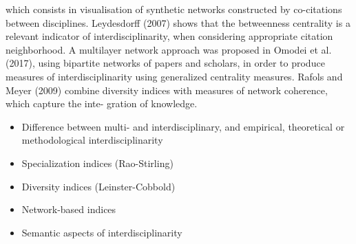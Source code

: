 {which consists in visualisation of synthetic networks constructed by co-citations between disciplines. Leydesdorff (2007) shows that the betweenness centrality is a relevant indicator of interdisciplinarity, when considering appropriate citation neighborhood. A multilayer network approach was proposed in Omodei et al. (2017), using bipartite networks of papers and scholars, in order to produce measures of interdisciplinarity using generalized centrality measures. Rafols and Meyer (2009) combine diversity indices with measures of network coherence, which capture the inte- gration of knowledge.


\begin{itemize}
	\item Difference between multi- and interdisciplinary, and empirical, theoretical or methodological interdisciplinarity \cite{huutoniemi2010analyzing}
	\item Specialization indices (Rao-Stirling) \cite{lariviere2010relationship}
	\item Diversity indices (Leinster-Cobbold) \cite{mugabushaka2016bibliometric}
	\item Network-based indices \cite{leydesdorff2007betweenness} \cite{rafols2009diversity}
	\item Semantic aspects of interdisciplinarity \cite{nichols2014topic} \cite{bouveyron2016stochastic}	
\end{itemize}




}


